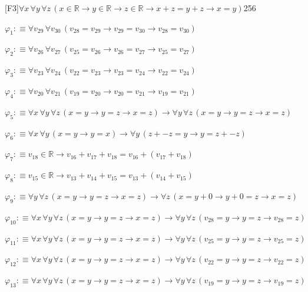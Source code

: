 \begin{fullproof}{[F3]}{$\forall x\,\forall y\,\forall z\,(x \in \mathbb{R} \to y \in \mathbb{R} \to z \in \mathbb{R} \to x + z = y + z \to x = y)$}{256}
\begin{ptree}
\noLine
{}
\end{ptree}
\begin{abbrevlist}
\item $\varphi_{1} :\equiv \forall v_{29}\,\forall v_{30}\,(v_{28} = v_{29} \to v_{29} = v_{30} \to v_{28} = v_{30})$
\item $\varphi_{2} :\equiv \forall v_{26}\,\forall v_{27}\,(v_{25} = v_{26} \to v_{26} = v_{27} \to v_{25} = v_{27})$
\item $\varphi_{3} :\equiv \forall v_{23}\,\forall v_{24}\,(v_{22} = v_{23} \to v_{23} = v_{24} \to v_{22} = v_{24})$
\item $\varphi_{4} :\equiv \forall v_{20}\,\forall v_{21}\,(v_{19} = v_{20} \to v_{20} = v_{21} \to v_{19} = v_{21})$
\item $\varphi_{5} :\equiv \forall x\,\forall y\,\forall z\,(x = y \to y = z \to x = z) \to \forall y\,\forall z\,(x = y \to y = z \to x = z)$
\item $\varphi_{6} :\equiv \forall x\,\forall y\,(x = y \to y = x) \to \forall y\,(z + -z = y \to y = z + -z)$
\item $\varphi_{7} :\equiv v_{18} \in \mathbb{R} \to v_{16} + v_{17} + v_{18} = v_{16} + (v_{17} + v_{18})$
\item $\varphi_{8} :\equiv v_{15} \in \mathbb{R} \to v_{13} + v_{14} + v_{15} = v_{13} + (v_{14} + v_{15})$
\item $\varphi_{9} :\equiv \forall y\,\forall z\,(x = y \to y = z \to x = z) \to \forall z\,(x = y + 0 \to y + 0 = z \to x = z)$
\item $\varphi_{10} :\equiv \forall x\,\forall y\,\forall z\,(x = y \to y = z \to x = z) \to \forall y\,\forall z\,(v_{28} = y \to y = z \to v_{28} = z)$
\item $\varphi_{11} :\equiv \forall x\,\forall y\,\forall z\,(x = y \to y = z \to x = z) \to \forall y\,\forall z\,(v_{25} = y \to y = z \to v_{25} = z)$
\item $\varphi_{12} :\equiv \forall x\,\forall y\,\forall z\,(x = y \to y = z \to x = z) \to \forall y\,\forall z\,(v_{22} = y \to y = z \to v_{22} = z)$
\item $\varphi_{13} :\equiv \forall x\,\forall y\,\forall z\,(x = y \to y = z \to x = z) \to \forall y\,\forall z\,(v_{19} = y \to y = z \to v_{19} = z)$

\end{abbrevlist}
\end{fullproof}
